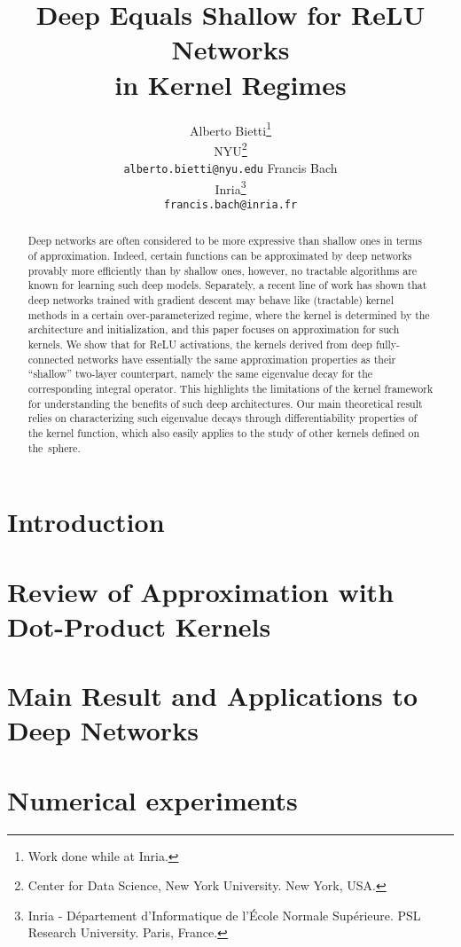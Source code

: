 \documentclass{article}
\title{Deep Equals Shallow for ReLU Networks \\ in Kernel Regimes}
\author{Alberto Bietti\thanks{Work done while at Inria.} \\
NYU\thanks{Center for Data Science, New York University. New York, USA.} \\
\texttt{alberto.bietti@nyu.edu}
\And
Francis Bach \\
Inria\thanks{Inria - Département d’Informatique de l’École Normale Supérieure.
PSL Research University.
Paris, France.} \\
\texttt{francis.bach@inria.fr} \\
}
\begin{document}
\maketitle

\begin{abstract}
Deep networks are often considered to be more expressive than shallow ones in terms of approximation.
Indeed, certain functions can be approximated by deep networks provably more efficiently than by shallow ones, however, no tractable algorithms are known for learning such deep models.
Separately, a recent line of work has shown that deep networks trained with gradient descent may behave like (tractable) kernel methods in a certain over-parameterized regime, where the kernel is determined by the architecture and initialization, and this paper focuses on approximation for such kernels.
We show that for ReLU activations, the kernels derived from deep fully-connected networks have essentially the same approximation properties as their ``shallow'' two-layer counterpart, namely the same eigenvalue decay for the corresponding integral operator. This highlights the limitations of the kernel framework for understanding the benefits of such deep architectures.
Our main theoretical result relies on characterizing such eigenvalue decays through differentiability properties of the kernel function, which also easily applies to the study of other kernels defined on the~sphere.
\end{abstract}

\section{Introduction}
\label{sec:introduction}


\section{Review of Approximation with Dot-Product Kernels}
\label{sec:background}


\section{Main Result and Applications to Deep Networks}
\label{sec:approx}



\section{Numerical experiments}
\label{sec:experiments}

\end{document}
